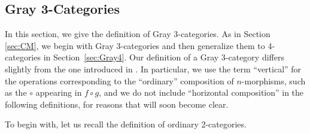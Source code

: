 \documentclass[11pt, reqno]{amsart} %
\theoremstyle{definition}
\theoremstyle{remark}
\numberwithin{equation}{section}
\begin{document}
\subsection{Gray 3-Categories} \label{sec:Gray}
In this section, we give the definition of Gray 3-categories. As in Section \ref{sec:CM}, we begin with Gray 3-categories and then generalize them to 4-categories in Section~\ref{sec:Gray4}. Our definition of a Gray 3-category differs slightly from the one introduced in \cite{Sarikaya:2024}. In particular, we use the term ``vertical'' for the operations corresponding to the ``ordinary'' composition of $n$-morphisms, such as the $\circ$ appearing in $f\circ g$, and we do not include ``horizontal composition'' in the following definitions, for reasons that will soon become clear.

To begin with, let us recall the definition of ordinary 2-categories.
\end{document}

